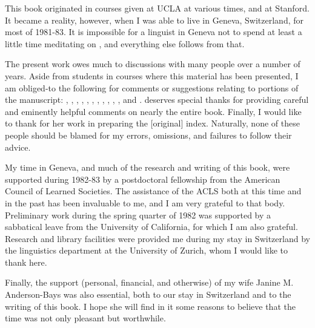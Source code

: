 \addchap{\lsPrefaceTitle}

This book originated in courses given at UCLA at various times, and at
Stanford. It became a reality, however, when I was able to live in
Geneva, Switzerland, for most of 1981-83. It is impossible for a
linguist in Geneva not to spend at least a little time meditating on
, and everything else follows from that. 

The present work owes much to discussions with many people over a
number of years. Aside from students in courses where this material
has been presented, I am obliged-to the following for comments or
suggestions relating to portions of the manuscript: , , , , , , , , , , , and .  deserves special thanks
for providing careful and eminently helpful comments on nearly the
entire book. Finally, I would like to thank  for her work
in preparing the {[original]} index. Naturally, none of these people should be
blamed for my errors, omissions, and failures to follow their advice.

My time in Geneva, and much of the research and writing of this book,
were supported during 1982-83 by a postdoctoral fellowship from the
American Council of Learned Societies. The assistance of the ACLS both
at this time and in the past has been invaluable to me, and I am very
grateful to that body. Preliminary work during the spring quarter of
1982 was supported by a sabbatical leave from the University of
California, for which I am also grateful. Research and library
facilities were provided me during my stay in Switzerland by the
linguistics department at the University of Zurich, whom I would like
to thank here.

Finally, the support (personal, financial, and otherwise) of my wife
Janine M. Anderson-Bays was also essential, both to our stay in
Switzerland and to the writing of this book. I hope she will find in
it some reasons to believe that the time was not only pleasant but
worthwhile.

